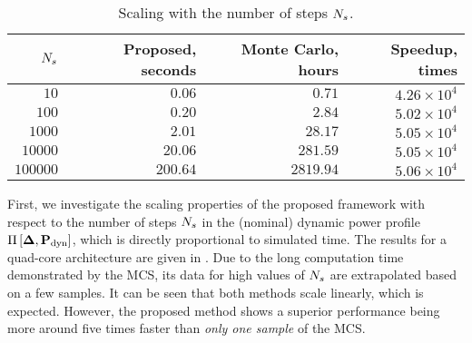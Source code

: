 \begin{table}
  \centering
  \caption{Scaling with the number of steps ${N_s}$.}
  \vspace{-10pt}
  \begin{tabular}{|r|r|r|r|}
    \hline
    ${N_s}$ & Proposed, seconds & Monte Carlo, hours & Speedup, times \\
    \hline
    $     10$ & $  0.06$ & $   0.71$ & $4.26 \times 10^4$ \\
    $    100$ & $  0.20$ & $   2.84$ & $5.02 \times 10^4$ \\
    $   1000$ & $  2.01$ & $  28.17$ & $5.05 \times 10^4$ \\
    $  10000$ & $ 20.06$ & $ 281.59$ & $5.05 \times 10^4$ \\
    $ 100000$ & $200.64$ & $2819.94$ & $5.06 \times 10^4$ \\
    \hline
  \end{tabular}
  \vspace{-10pt}
\end{table}
First, we investigate the scaling properties of the proposed framework with respect to the number of steps ${N_s}$ in the (nominal) dynamic power profile $\prof{\mP_\dyn}$, which is directly proportional to simulated time. The results for a quad-core architecture are given in . Due to the long computation time demonstrated by the MCS, its data for high values of ${N_s}$ are extrapolated based on a few samples. It can be seen that both methods scale linearly, which is expected. However, the proposed method shows a superior performance being more around five times faster than \emph{only one sample} of the MCS.

